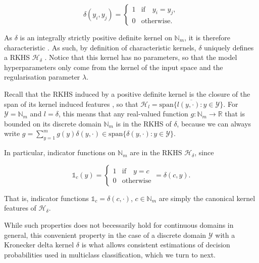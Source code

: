 \documentclass{article}
\begin{document}
	\begin{equation}
		\delta(y_{i}, y_{j}) = \begin{cases}
		1 & \mathrm{if } \quad y_{i} = y_{j}, \\
		0 & \mathrm{otherwise}.
		\end{cases}
	\end{equation}
	
	As $\delta$ is an integrally strictly positive definite kernel on $\mathbb{N}_{m}$, it is therefore characteristic \citep[Theorem 7]{sriperumbudur2010hilbert}. As such, by definition of characteristic kernels, $\delta$ uniquely defines a RKHS $\mathcal{H}_{\delta}$ \citep{fukumizu2004dimensionality}. Notice that this kernel has no parameters, so that the model hyperparameters only come from the kernel of the input space and the regularisation parameter $\lambda$.
	
	Recall that the RKHS induced by a positive definite kernel is the closure of the span of its kernel induced features \citep{xu2009refinement}, so that $\mathcal{H}_{l} = \overline{\mathrm{span}\{l(y, \cdot) : y \in \mathcal{Y}\}}$. For $\mathcal{Y} = \mathbb{N}_{m}$ and $l = \delta$, this means that any real-valued function $g : \mathbb{N}_{m} \to \mathbb{R}$ that is bounded on its discrete domain $\mathbb{N}_{m}$ is in the RKHS of $\delta$, because we can always write $g = \sum_{y = 1}^{m} g(y) \delta(y, \cdot) \in \mathrm{span}\{\delta(y, \cdot) : y \in \mathcal{Y}\}$.
	
	In particular, indicator functions on $\mathbb{N}_{m}$ are in the RKHS $\mathcal{H}_{\delta}$, since
	
	\begin{equation}
		\mathbb{1}_{c}(y) = \begin{cases}
		1 & \mathrm{if } \quad y = c \\
		0 & \mathrm{otherwise}
		\end{cases} = \delta(c, y).
	\label{eq:indicator_function}
	\end{equation}
	
	That is, indicator functions $\mathbb{1}_{c} = \delta(c, \cdot)$, $c \in \mathbb{N}_{m}$ are simply the canonical kernel features of $\mathcal{H}_{\delta}$. 
	
	While such properties does not becessarily hold for continuous domains in general, this convenient property in the case of a discrete domain $\mathcal{Y}$ with a Kronecker delta kernel $\delta$ is what allows consistent estimations of decision probabilities used in multiclass classification, which we turn to next.
	
\end{document}
